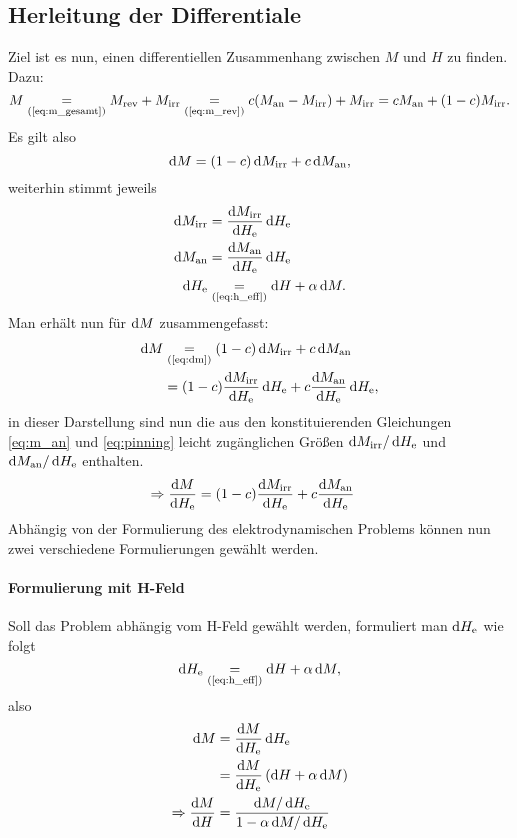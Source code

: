 \documentclass{scrartcl}
\newcommand{\He}{H_\text{e}}
\newcommand{\Man}{M_\text{an}}
\newcommand{\Mirr}{M_\text{irr}}
\newcommand{\Mrev}{M_\text{rev}}
\newcommand{\textref}[1]{\text{(\ref{#1})}}
\newcommand{\eqr}[1]{\underset{\textref{#1}}{=}}
\begin{document}
\subsection{Herleitung der Differentiale}
Ziel ist es nun, einen differentiellen Zusammenhang zwischen $M$ und $H$ zu finden. Dazu:
\begin{equation}
	M \underset{\textref{eq:m_gesamt}}{=} \Mrev + \Mirr \underset{\textref{eq:m_rev}}{=} c (\Man - \Mirr) + \Mirr = c\Man + (1-c)\Mirr.
\end{equation}
Es gilt also
\begin{equation}
	\dif M = (1-c) \dif\Mirr + c\dif \Man \label{eq:dm},
\end{equation}
weiterhin stimmt jeweils
\begin{align}
	\dif \Mirr &= \frac{\dif \Mirr}{\dif \He}\dif \He \\
	\dif \Man &= \frac{\dif \Man}{\dif \He}\dif \He\\
	\dif \He & \underset{\textref{eq:h_eff}}{=} \dif H + \alpha \dif M.
\end{align}
Man erhält nun für $\mathop{}\!\mathrm{d} M$ zusammengefasst:
\begin{align}
	\begin{split}
		\dif M &\eqr{eq:dm} (1-c) \dif\Mirr + c\dif \Man \\
				&= (1-c) \frac{\dif \Mirr}{\dif \He}\dif \He + c \frac{\dif \Man}{\dif \He}\dif \He,
	\end{split}
\end{align}
in dieser Darstellung sind nun die aus den konstituierenden Gleichungen \ref{eq:m_an} und \ref{eq:pinning} leicht zugänglichen Größen $\dif \Mirr/\dif \He$ und $\dif \Man/\dif \He$ enthalten.
\begin{align}
	\Rightarrow \frac{\dif M}{\dif \He} &= (1-c) \frac{\dif \Mirr}{\dif \He} + c \frac{\dif \Man}{\dif \He} \label{eq:dm_dhe}
\end{align}
Abhängig von der Formulierung des elektrodynamischen Problems können nun zwei verschiedene Formulierungen gewählt werden.
\paragraph{Formulierung mit H-Feld}
Soll das Problem abhängig vom H-Feld gewählt werden, formuliert man $\dif \He$ wie folgt
\begin{equation}
	\dif \He \eqr{eq:h_eff} \dif H + \alpha \dif M,
\end{equation}
also
\begin{align}
	\dif M &= \frac{\dif M}{\dif \He} \dif \He \\
	&= \frac{\dif M}{\dif \He} \left(\dif H + \alpha \dif M\right) \\
	\Rightarrow \frac{\dif M}{\dif H} &= \frac{\dif M / \dif \He}{1 - \alpha \dif M /\dif \He}
\end{align}
\end{document}
